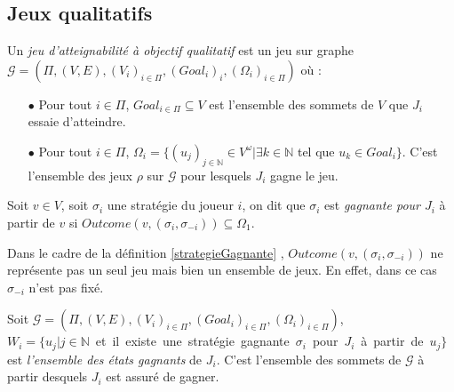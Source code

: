 

\subsection{Jeux qualitatifs}

	
	\begin{defi}
		Un \textit{jeu d'atteignabilité à objectif qualitatif} est un jeu sur graphe $\mathcal{G} = (\Pi,(V,E),(V_{i})_{i \in \Pi}, (Goal_{i})_{i},(\Omega _{i})_{i \in \Pi})$ où :
		\begin{enumerate}
			\item[$\bullet$] Pour tout $i \in \Pi$, $Goal_{i\in \Pi} \subseteq V $ est l'ensemble des sommets de $V$ que $J_{i}$ essaie d'atteindre.
			\item[$\bullet$] Pour tout $i \in \Pi$, $\Omega _{i} = \{(u_{j})_{j \in \mathbb{N}}\in V^{\omega}| \exists k \in \mathbb{N}$  tel que $u_{k}\in Goal_{i}\}$. C'est l'ensemble des jeux $\rho$ sur $\mathcal{G}$ pour lesquels $J_{i}$ gagne le jeu.
		\end{enumerate}	
	\end{defi}
	
	\label{strategieGagnante}
	\begin{defi}
		Soit $v \in V$, soit $\sigma _{i}$ une stratégie du joueur $i$, on dit que $\sigma _{i}$ est \textit{gagnante pour $J_{i}$} à partir de $v$ si $Outcome(v,(\sigma _{i}, \sigma _{-i})) \subseteq \Omega _{1}$.
	\end{defi}
	
	\begin{rem}
		Dans le cadre de la définition \ref{strategieGagnante} , $Outcome(v,(\sigma _{i}, \sigma _{-i}))$ ne représente pas un seul jeu mais bien un ensemble de jeux. En effet, dans ce cas $\sigma _{-i}$ n'est pas fixé.
	\end{rem}
	
	
	\begin{defi}
		Soit $\mathcal{G} = (\Pi,(V,E),(V_{i})_{i \in \Pi}, (Goal_{i})_{i \in \Pi},(\Omega _{i})_{i \in \Pi})$,\\
		\mbox{$W_{i} = \{ u_{j} |j\in \mathbb{N}$ et il existe une stratégie gagnante $\sigma _{i}$ pour $J_{i}$ à partir de $u_{j}\}$} est \textit{l'ensemble des états gagnants} de $J_{i}$. C'est l'ensemble des sommets de $\mathcal{G}$ à partir desquels $J_{i}$ est assuré de gagner.
	\end{defi}
	

